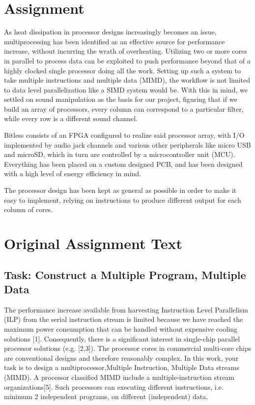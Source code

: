 \section{Assignment}

As heat dissipation in processor designs increasingly becomes an issue, multiprocessing has been identified as an effective source for performance increase, without incurring the wrath of overheating. Utilizing two or more cores in parallel to process data can be exploited to push performance beyond that of a highly clocked single processor doing all the work. Setting up such a system to take multiple instructions and multiple data (MIMD), the workflow is not limited to data level parallelization like a SIMD system would be. With this in mind, we settled on sound manipulation as the basis for our project, figuring that if we build an array of processors, every column can correspond to a particular filter, while every row is a different sound channel.
\newline

Bitless consists of an FPGA configured to realize said processor array, with I/O implemented by audio jack channels and various other peripherals like micro USB and microSD, which in turn are controlled by a microcontroller unit (MCU). Everything has been placed on a custom designed PCB, and has been designed with a high level of energy efficiency in mind.
\newline

The processor design has been kept as general as possible in order to make it easy to implement, relying on instructions to produce different output for each column of cores.
\newline


\section{Original Assignment Text}

\subsection{Task: Construct a Multiple Program, Multiple Data}
The performance increase available from harvesting Instruction Level Parallelism (ILP) from the serial 
instruction stream is limited because we have reached the maximum power consumption that can be 
handled without expensive cooling solutions [1]. Consequently, there is a significant interest in 
single-chip parallel processor solutions (e.g. [2,3]). The processor cores in commercial multi-core 
chips are conventional designs and therefore reasonably complex. In this work, your task is to design 
a multiprocessor,Multiple Instruction, Multiple Data streams (MIMD). A processor classified MIMD 
include a multiple-instruction stream organizations[5]. Such processors can executing different 
instructions, i.e. minimum 2 independent programs, on different (independent) data. 
 
